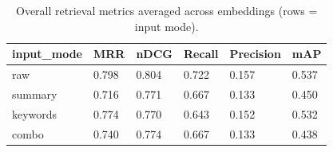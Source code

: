 \begin{table}
\caption{Overall retrieval metrics averaged across embeddings (rows = input mode).}
\label{tab:overview-by-input-mode}
\begin{tabular}{llllll}
\toprule
input_mode & MRR & nDCG & Recall & Precision & mAP \\
\midrule
raw & 0.798 & 0.804 & 0.722 & 0.157 & 0.537 \\
summary & 0.716 & 0.771 & 0.667 & 0.133 & 0.450 \\
keywords & 0.774 & 0.770 & 0.643 & 0.152 & 0.532 \\
combo & 0.740 & 0.774 & 0.667 & 0.133 & 0.438 \\
\bottomrule
\end{tabular}
\end{table}
